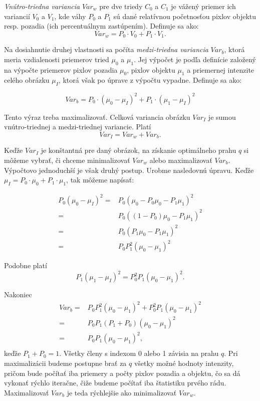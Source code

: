 \documentclass[a4paper,11pt,oneside]{article}%
\begin{document}
\textit{Vnútro-triedna variancia} $Var_w$ pre dve triedy $C_0$ a $C_1$ je vážený priemer ich variancií $V_0 $ a $ V_1 $, kde váhy $P_0$ a $P_1$ sú dané relatívnou početnosťou pixlov objektu resp. pozadia (ich percentuálnym zastúpením). 
 Definuje sa ako:
\begin{equation}
Var_w= P_0 \cdot V_0 + P_1\cdot V_1.
\end{equation}

Na dosiahnutie druhej vlastnosti sa počíta \textit{medzi-triedna variancia} $ Var_b $, ktorá meria vzdialenosti priemerov tried $ \mu_0$ a $\mu_1 $. Jej výpočet je podľa definície založený na výpočte priemerov pixlov pozadia $\mu_0 $, pixlov objektu $\mu_1 $ a priemernej intenzite celého obrázku $\mu_I $, ktorá však po úprave z výpočtu vypadne. Definuje sa ako:

\begin{equation}
Var_b= P_0 \cdot  (\mu_0-\mu_I)^2 + P_1 \cdot (\mu_1-\mu_I)^2
\end{equation}

Tento výraz treba maximalizovať. 
Celková variancia obrázku $ Var_I $ je sumou vnútro-triednej a medzi-triednej variancie. Platí
$$ Var_I=Var_w+Var_b. $$

Keďže $Var_I $ je konštantná pre daný obrázok, na získanie optimálneho prahu $ q $  si môžeme vybrať, či chceme minimalizovať $Var_w $ alebo maximalizovať $ Var_b $. Výpočtovo jednoduchší je však druhý postup.  Urobme nasledovnú úpravu. Keďže $ \mu_I=P_0\cdot \mu_0 +P_1\cdot \mu_1 $, tak môžeme napísať:

\begin{equation}
\begin{aligned}
P_0 (\mu_0-\mu_I )^2= & P_0 (\mu_0-P_0 \mu_0-P_1 \mu_1 )^2 \\
			        = & P_0 ((1-P_0 ) \mu_0-P_1 \mu_1 )^2 \\
			        = & P_0 (P_1 \mu_0-P_1 \mu_1 )^2 \\
			        = & P_0 P_1^2(\mu_0-\mu_1 )^2
\end{aligned}
\end{equation}

Podobne platí
\begin{equation}
P_1 (\mu_1-\mu_I )^2= P_0^2 P_1(\mu_0-\mu_1 )^2.
\end{equation}

Nakoniec
\begin{equation}
\begin{aligned}
Var_b= & P_0 P_1^2(\mu_0-\mu_1 )^2+P_0^2 P_1(\mu_0-\mu_1 )^2 \\
     = & P_0 P_1(P_1 + P_0)(\mu_0-\mu_1 )^2 \\
      = & P_0 P_1(\mu_0-\mu_1 )^2, \\
\end{aligned}
\end{equation}
keďže $ P_1 + P_0=1 $.
Všetky členy s indexom 0 alebo 1 závisia na prahu $ q $. Pri maximalizácii budeme postupne brať za  $ q $ všetky možné hodnoty intenzity, pričom bude počítať iba priemery a počty pixlov pozadia a objektu, čo sa dá vykonať rýchlo iteračne, čiže budeme počítať iba štatistiku prvého rádu. Maximalizovať $ Var_b $ je teda rýchlejšie
ako minimalizovať $ Var_w $.
\end{document}
